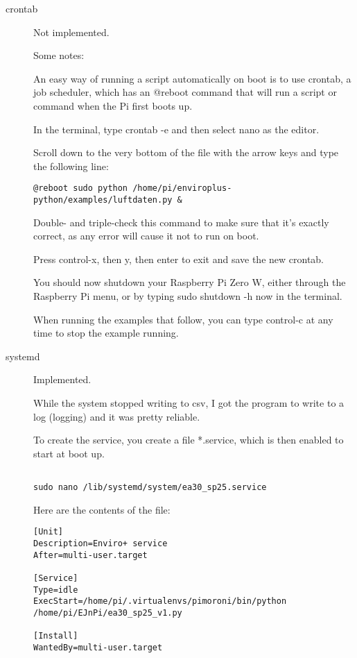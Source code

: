 \documentclass{article}
\begin{document}
\begin{description}
\item[crontab] Not implemented.

Some notes: 

An easy way of running a script automatically on boot is to use crontab, a job scheduler, which has an @reboot command that will run a script or command when the Pi first boots up.

In the terminal, type crontab -e and then select nano as the editor.

Scroll down to the very bottom of the file with the arrow keys and type the following line:


\begin{verbatim}
@reboot sudo python /home/pi/enviroplus-python/examples/luftdaten.py &
\end{verbatim}

Double- and triple-check this command to make sure that it's exactly correct, as any error will cause it not to run on boot.

Press control-x, then y, then enter to exit and save the new crontab.

You should now shutdown your Raspberry Pi Zero W, either through the Raspberry Pi menu, or by typing sudo shutdown -h now in the terminal.


When running the examples that follow, you can type control-c at any time to stop the example running.

\item[systemd] Implemented.

While the system stopped writing to csv, I got the program to write to a log (logging) and it was pretty reliable. 

To create the service, you create a file *.service, which is then enabled to start at boot up.

\begin{verbatim}

sudo nano /lib/systemd/system/ea30_sp25.service

\end{verbatim}

Here are the contents of the file: 

\begin{verbatim}
[Unit]
Description=Enviro+ service
After=multi-user.target

[Service]
Type=idle
ExecStart=/home/pi/.virtualenvs/pimoroni/bin/python /home/pi/EJnPi/ea30_sp25_v1.py

[Install]
WantedBy=multi-user.target
\end{verbatim}


\end{description}
\end{document}
